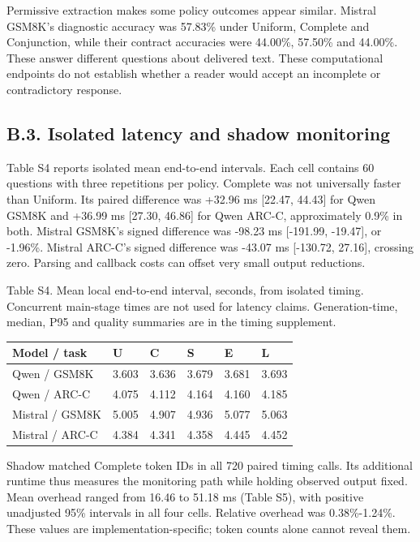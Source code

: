 \documentclass[
  12pt,
  a4paper,
]{article}
\begin{document}
Permissive extraction makes some policy outcomes appear similar. Mistral
GSM8K's diagnostic accuracy was 57.83\% under Uniform, Complete and
Conjunction, while their contract accuracies were 44.00\%, 57.50\% and
44.00\%. These answer different questions about delivered text. These
computational endpoints do not establish whether a reader would accept
an incomplete or contradictory response.

\subsection{B.3. Isolated latency and shadow
monitoring}\label{b.3.-isolated-latency-and-shadow-monitoring}

Table S4 reports isolated mean end-to-end intervals. Each cell contains
60 questions with three repetitions per policy. Complete was not
universally faster than Uniform. Its paired difference was +32.96 ms
{[}22.47, 44.43{]} for Qwen GSM8K and +36.99 ms {[}27.30, 46.86{]} for
Qwen ARC-C, approximately 0.9\% in both. Mistral GSM8K's signed
difference was -98.23 ms {[}-191.99, -19.47{]}, or -1.96\%. Mistral
ARC-C's signed difference was -43.07 ms {[}-130.72, 27.16{]}, crossing
zero. Parsing and callback costs can offset very small output
reductions.

Table S4. Mean local end-to-end interval, seconds, from isolated timing.
Concurrent main-stage times are not used for latency claims.
Generation-time, median, P95 and quality summaries are in the timing
supplement.

\begin{longtable}[]{@{}llllll@{}}
\toprule\noalign{}
Model / task & U & C & S & E & L \\
\midrule\noalign{}
\endhead
\bottomrule\noalign{}
\endlastfoot
Qwen / GSM8K & 3.603 & 3.636 & 3.679 & 3.681 & 3.693 \\
Qwen / ARC-C & 4.075 & 4.112 & 4.164 & 4.160 & 4.185 \\
Mistral / GSM8K & 5.005 & 4.907 & 4.936 & 5.077 & 5.063 \\
Mistral / ARC-C & 4.384 & 4.341 & 4.358 & 4.445 & 4.452 \\
\end{longtable}

Shadow matched Complete token IDs in all 720 paired timing calls. Its
additional runtime thus measures the monitoring path while holding
observed output fixed. Mean overhead ranged from 16.46 to 51.18 ms
(Table S5), with positive unadjusted 95\% intervals in all four cells.
Relative overhead was 0.38\%-1.24\%. These values are
implementation-specific; token counts alone cannot reveal them.
\end{document}
